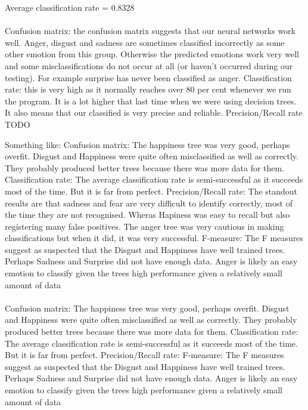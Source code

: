 \documentclass[12pt]{article}
\begin{document}
Average classification rate = 0.8328 \\ \\
Confusion matrix: the confusion matrix suggests that our neural networks work well. Anger, disgust and sadness are sometimes classified incorrectly as some other emotion from this group. Otherwise the predicted emotions work very well and some misclassifications do not occur at all (or haven't occurred during our testing). For example surprise has never been classified as anger. Classification rate: this is very high as it normally reaches over 80 per cent whenever we run the program. It is a lot higher that last time when we were using decision trees. It also means that our classified is very precise and reliable. Precision/Recall rate TODO

Something like:
Confusion matrix: The happiness tree was very good, perhaps overfit. Disgust and Happiness were quite often misclassified as well as correctly. They probably produced better trees because there was more data for them. Classification rate: The average classification rate is semi-successful as it succeeds most of the time. But it is far from perfect. Precision/Recall rate: The standout results are that sadness and fear are very difficult to identify correctly, most of the time they are not recognised. Wheras Hapiness was easy to recall but also registering many false positives. The anger tree was very cautious in making classifications but when it did, it was very successful.  F-measure: The F measures suggest as suspected that the Disgust and Happiness have well trained trees. Perhaps Sadness and Surprise did not have enough data. Anger is likely an easy emotion to classify given the trees high performance given a relatively small amount of data \\ \\

Confusion matrix: The happiness tree was very good, perhaps overfit. Disgust and Happiness were quite often misclassified as well as correctly. They probably produced better trees because there was more data for them. Classification rate: The average classification rate is semi-successful as it succeeds most of the time. But it is far from perfect. Precision/Recall rate:  F-measure: The F measures suggest as suspected that the Disgust and Happiness have well trained trees. Perhaps Sadness and Surprise did not have enough data. Anger is likely an easy emotion to classify given the trees high performance given a relatively small amount of data \\ \\
\end{document}
